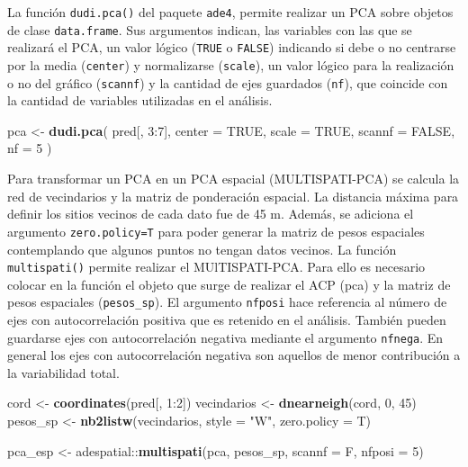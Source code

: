 \documentclass[11pt,b5paper,]{krantz}
\newenvironment{Shaded}{}{}
\newcommand{\DataTypeTok}[1]{\textcolor[rgb]{0.56,0.13,0.00}{#1}}
\newcommand{\DecValTok}[1]{\textcolor[rgb]{0.25,0.63,0.44}{#1}}
\newcommand{\KeywordTok}[1]{\textcolor[rgb]{0.00,0.44,0.13}{\textbf{#1}}}
\newcommand{\NormalTok}[1]{#1}
\newcommand{\OperatorTok}[1]{\textcolor[rgb]{0.40,0.40,0.40}{#1}}
\newcommand{\OtherTok}[1]{\textcolor[rgb]{0.00,0.44,0.13}{#1}}
\newcommand{\StringTok}[1]{\textcolor[rgb]{0.25,0.44,0.63}{#1}}
\begin{document}
La función \texttt{dudi.pca()} del paquete \texttt{ade4}, permite realizar un PCA sobre objetos de clase \texttt{data.frame}. Sus argumentos indican, las variables con las que se realizará el PCA, un valor lógico (\texttt{TRUE} o \texttt{FALSE}) indicando si debe o no centrarse por la media (\texttt{center}) y normalizarse (\texttt{scale}), un valor lógico para la realización o no del gráfico (\texttt{scannf}) y la cantidad de ejes guardados (\texttt{nf}), que coincide con la cantidad de variables utilizadas en el análisis.

\begin{Shaded}
\begin{Highlighting}[]
\NormalTok{pca <-}
\StringTok{  }\KeywordTok{dudi.pca}\NormalTok{(}
\NormalTok{    pred[, }\DecValTok{3}\OperatorTok{:}\DecValTok{7}\NormalTok{],}
    \DataTypeTok{center =} \OtherTok{TRUE}\NormalTok{,}
    \DataTypeTok{scale =} \OtherTok{TRUE}\NormalTok{,}
    \DataTypeTok{scannf =} \OtherTok{FALSE}\NormalTok{,}
    \DataTypeTok{nf =} \DecValTok{5}
\NormalTok{  )}
\end{Highlighting}
\end{Shaded}

Para transformar un PCA en un PCA espacial (MULTISPATI-PCA) se calcula la red de vecindarios y la matriz de ponderación espacial. La distancia máxima para definir los sitios vecinos de cada dato fue de 45 m. Además, se adiciona el argumento \texttt{zero.policy=T} para poder generar la matriz de pesos espaciales contemplando que algunos puntos no tengan datos vecinos. La función \texttt{multispati()} permite realizar el MUlTISPATI-PCA. Para ello es necesario colocar en la función el objeto que surge de realizar el ACP (pca) y la matriz de pesos espaciales (\texttt{pesos\_sp}). El argumento \texttt{nfposi} hace referencia al número de ejes con autocorrelación positiva que es retenido en el análisis. También pueden guardarse ejes con autocorrelación negativa mediante el argumento \texttt{nfnega}. En general los ejes con autocorrelación negativa son aquellos de menor contribución a la variabilidad total.

\begin{Shaded}
\begin{Highlighting}[]
\NormalTok{cord <-}\StringTok{ }\KeywordTok{coordinates}\NormalTok{(pred[, }\DecValTok{1}\OperatorTok{:}\DecValTok{2}\NormalTok{])}
\NormalTok{vecindarios <-}\StringTok{ }\KeywordTok{dnearneigh}\NormalTok{(cord, }\DecValTok{0}\NormalTok{, }\DecValTok{45}\NormalTok{)}
\NormalTok{pesos_sp <-}\StringTok{ }\KeywordTok{nb2listw}\NormalTok{(vecindarios, }
                     \DataTypeTok{style =} \StringTok{"W"}\NormalTok{, }
                     \DataTypeTok{zero.policy =}\NormalTok{ T)}

\NormalTok{pca_esp <-}
\StringTok{  }\NormalTok{adespatial}\OperatorTok{::}\KeywordTok{multispati}\NormalTok{(pca, pesos_sp, }
                         \DataTypeTok{scannf =}\NormalTok{ F, }\DataTypeTok{nfposi =} \DecValTok{5}\NormalTok{)}
\end{Highlighting}
\end{Shaded}
\end{document}
